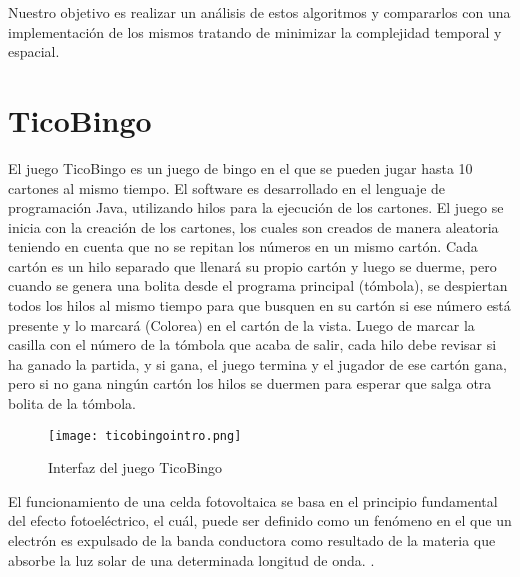 \documentclass[10pt,twocolumn]{article}
\begin{document}
 Nuestro objetivo es realizar un análisis de estos algoritmos y compararlos con una implementación de los mismos tratando de minimizar la complejidad temporal y espacial.

\section{TicoBingo}

El juego TicoBingo es un juego de bingo en el que se pueden jugar hasta 10 cartones al mismo tiempo. 
El software es desarrollado en el lenguaje de programación Java, utilizando hilos para la ejecución de los cartones.
El juego se inicia con la creación de los cartones, los cuales son creados de manera aleatoria teniendo en cuenta que no se repitan los números en un mismo cartón.
Cada cartón es un hilo separado que llenará su propio cartón y luego se duerme, pero cuando se genera una bolita desde el programa principal (tómbola), se despiertan todos los hilos al mismo tiempo para que busquen en su cartón si ese número está presente y lo marcará (Colorea) en el cartón de la vista. Luego de marcar la casilla con el número de la tómbola que acaba de salir, cada hilo debe revisar si ha ganado la partida, y si gana, el juego termina y el jugador de ese cartón gana, pero si no gana ningún cartón los hilos se duermen para esperar que salga otra bolita de la tómbola.


  \begin{figure}[h]
 	\centering
 	\texttt{[image: ticobingointro.png]}
 	\caption{Interfaz del juego TicoBingo}
 	\label{arreglo_pv}
 \end{figure}
 
El funcionamiento de una celda fotovoltaica se basa en el principio fundamental del efecto fotoeléctrico, el cuál, puede ser definido como un fenómeno en el que un electrón es expulsado de la banda conductora como resultado de la materia que absorbe la luz solar de una determinada longitud de onda. \cite{sreega2017design}.
\end{document}
